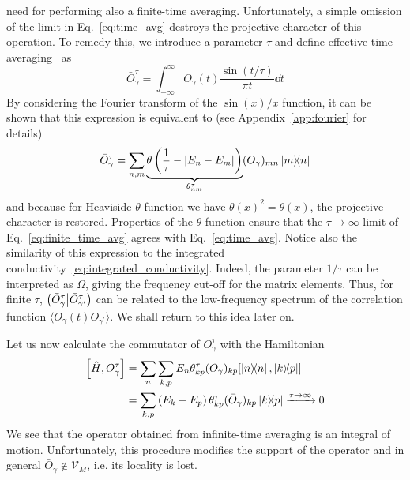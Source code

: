 need for performing also a finite-time averaging. Unfortunately, a simple omission of the limit
in Eq.~\eqref{eq:time_avg} destroys the projective character of this operation. To remedy this,
we introduce a parameter \(\tau\) and define effective time averaging~\autocite{Mierzejewski2015}
as
\begin{equation}
  \bar{O}_{\gamma}^{\tau} = \int_{-\infty}^{\infty} O_{\gamma}(t) \frac{\sin(t/\tau)}{\pi t} \dd{t}
  \label{eq:finite_time_avg_integral}
\end{equation}
By considering the Fourier transform of the \(\sin(x)/x\) function, it can be shown that
this expression is equivalent to (see Appendix~\ref{app:fourier} for details)
\begin{equation}
  \bar{O}_{\gamma}^{\tau} = \sum_{n,m} \underbrace{\theta\left(\frac{1}{\tau} - |E_n - E_m|\right)}_{\theta_{nm}^{\tau}} (O_{\gamma})_{mn} \ketbra{m}{n}
  \label{eq:finite_time_avg}
\end{equation}
and because for Heaviside \(\theta \)-function we have \(\theta(x)^2 = \theta(x)\), the projective character is restored.
Properties of the \(\theta\)-function ensure that the \(\tau\to\infty\) limit of Eq.~\eqref{eq:finite_time_avg}
agrees with Eq.~\eqref{eq:time_avg}. Notice also the similarity of this expression to the integrated conductivity~\eqref{eq:integrated_conductivity}.
Indeed, the parameter \(1/\tau\) can be interpreted as \(\Omega\), giving the frequency cut-off for the matrix elements.
Thus, for finite \(\tau\), \(\left(\bar{O}_{\gamma}^{\tau} \middle| \bar{O}_{\gamma^{\prime}}^{\tau}\right)\) can be related to the low-frequency spectrum of
the correlation function \(\langle O_{\gamma}(t) O_{\gamma^{\prime}} \rangle\). We shall return to this idea later on.

Let us now calculate the commutator of \(O_{\gamma}^{\tau}\) with the Hamiltonian
\begin{align}
  \comm{\hat{H} }{\bar{O}_{\gamma}^{\tau}} & = \sum_n \sum_{k,p} E_n \theta_{kp}^{\tau} (\bar{O}_{\gamma})_{kp} \comm{ \ketbra{n}{n}}{ \ketbra{k}{p}} \nonumber         \\
                                           & = \sum_{k,p} \left(E_k-E_p\right) \theta_{kp}^{\tau} (\bar{O}_{\gamma})_{kp} \ketbra{k}{p} \xrightarrow{\tau \to \infty} 0
  \label{eq:time_averaged_commutator}
\end{align}
We see that the operator obtained from infinite-time averaging is an integral of motion. Unfortunately,
this procedure modifies the support of the operator and in general \(\bar{O}_{\gamma} \not\in \mathcal{V}_M\), i.e. its locality is lost.

